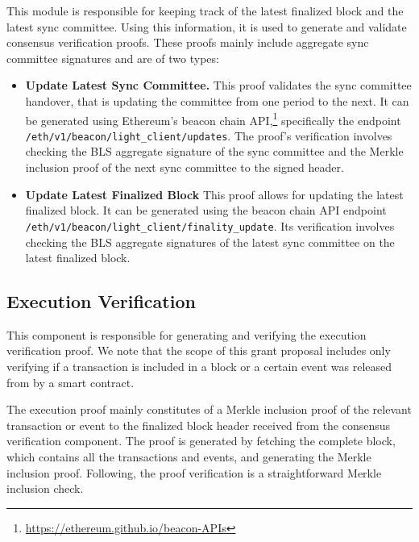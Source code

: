 This module is responsible for keeping track of the latest finalized block and
the latest sync committee. Using this information, it is used to generate and
validate consensus verification proofs. These proofs mainly include aggregate
sync committee signatures and are of two types:
\begin{itemize}
    \item \textbf{Update Latest Sync Committee.} This proof validates the sync
        committee handover, that is updating the committee from one period to
        the next. It can be generated using Ethereum's beacon chain API,\footnote{\url{https://ethereum.github.io/beacon-APIs}}
        specifically the endpoint
        \texttt{/eth/v1/beacon/light\_client/updates}.
        The proof's verification involves checking the BLS aggregate signature
        of the sync committee and the Merkle inclusion proof of the next sync
        committee to the signed header.
    \item \textbf{Update Latest Finalized Block} This proof allows for updating
        the latest finalized block. It can be generated using the beacon chain
        API endpoint \texttt{/eth/v1/beacon/light\_client/finality\_update}.
        Its verification involves checking the BLS aggregate signatures of the
        latest sync committee on the latest finalized block.
\end{itemize}

\subsection{Execution Verification}

This component is responsible for generating and verifying the execution
verification proof. We note that the scope of this grant proposal includes only
verifying if a transaction is included in a block or a certain event was
released from by a smart contract. 

The execution proof mainly constitutes of a Merkle inclusion proof of the
relevant transaction or event to the finalized block header received from the
consensus verification component. The proof is generated by fetching the
complete block, which contains all the transactions and events, and generating
the Merkle inclusion proof. Following, the proof verification is a
straightforward Merkle inclusion check.

